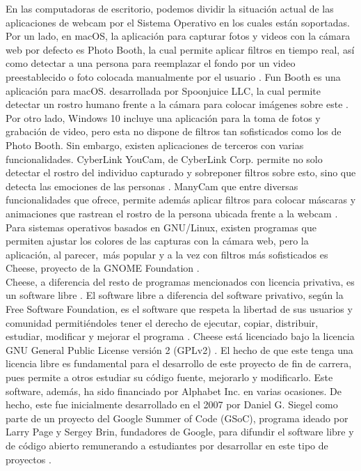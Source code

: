 \documentclass[a4paper,openright,12pt]{report}
\begin{document}
En las computadoras de escritorio, podemos dividir la situación actual de las
aplicaciones de webcam por el Sistema Operativo en los cuales están soportadas.
Por un lado, en macOS, la aplicación para capturar fotos y videos con la cámara
web por defecto es Photo Booth, la cual permite aplicar filtros en tiempo real,
así como detectar a una persona para reemplazar el fondo por un video
preestablecido o foto colocada manualmente por el usuario \cite{photoBooth}. Fun
Booth es una aplicación para macOS. desarrollada por Spoonjuice LLC, la cual
permite detectar un rostro humano frente a la cámara para colocar imágenes sobre
este \cite{funBooth}. Por otro lado, Windows 10 incluye una aplicación para la toma de fotos y grabación de
video, pero esta no dispone de filtros tan sofisticados como los de Photo Booth.
Sin embargo, existen aplicaciones de terceros con varias funcionalidades.
CyberLink YouCam, de CyberLink Corp. permite no solo detectar el rostro del
individuo capturado y sobreponer filtros sobre esto, sino que detecta las
emociones de las personas \cite{YouCam7A82}⁠. ManyCam que entre diversas
funcionalidades que ofrece, permite además aplicar filtros para colocar máscaras
y animaciones que rastrean el rostro de la persona ubicada frente a la webcam
\cite{Webcamso75}. Para sistemas operativos basados en GNU/Linux, existen
programas que permiten ajustar los colores de las capturas con la cámara web,
pero la aplicación, al parecer, más popular y a la vez con filtros más
sofisticados es Cheese, proyecto de la GNOME Foundation \cite{AppsChee13}.⁠\\

Cheese, a diferencia del resto de programas mencionados con licencia privativa,
es un software libre \cite{cheeseLicense}⁠. El software libre a diferencia del software privativo,
según la Free Software Foundation, es el software que respeta la libertad de sus
usuarios y comunidad permitiéndoles tener el derecho de ejecutar, copiar,
distribuir, estudiar, modificar y mejorar el programa \cite{whatIsFreeSoftware}⁠.
Cheese está licenciado bajo la licencia GNU General Public License versión 2
(GPLv2) \cite{cheeseLicense}⁠.
El hecho de que este tenga una licencia libre es fundamental para el desarrollo
de este proyecto de fin de carrera, pues permite a otros estudiar su código
fuente, mejorarlo y modificarlo. Este software, además, ha sido financiado por
Alphabet Inc. en varias ocasiones. De hecho, este fue inicialmente desarrollado
en el 2007 por Daniel G. Siegel como parte de un proyecto del Google Summer of
Code (GSoC), programa ideado por Larry Page y Sergey Brin, fundadores de Google,
para difundir el software libre y de código abierto remunerando a estudiantes
por desarrollar en este tipo de proyectos \cite{gsoc1}.\\
\end{document}
